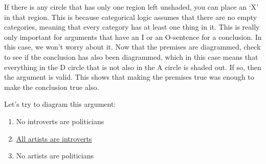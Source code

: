 \documentclass[../logic-text.tex]{subfiles}
\begin{document}




If there is any circle that has only one region left unshaded, you can place an `X' in that region. This is because categorical logic assumes that there are no empty categories, meaning that every category has at least one thing in it. This is really only important for arguments that have an I or an O-sentence for a conclusion. In this case, we won't worry about it.  Now that the premises are diagrammed, check to see if the conclusion has also been diagrammed, which in this case means that everything in the D circle that is not also in the A circle is shaded out. If so, then the argument is valid. This shows that making the premises true was enough to make the conclusion true also.

Let's try to diagram this argument:

\begin{enumerate}
\item No introverts are politicians 
\item \underline{All artists are introverts}
\item No artists are politicians
\end{enumerate}


\end{document}
